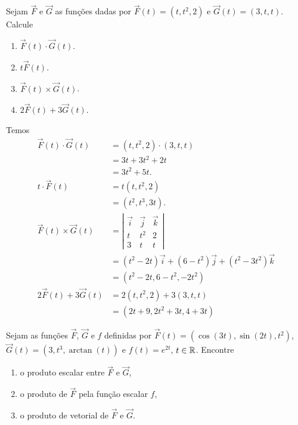 \begin{example}
    Sejam \(\overrightarrow{F} \) e \(\overrightarrow{G}\) as funções dadas por \(\overrightarrow{F}(t) = (t, t^2, 2)\) e \(\overrightarrow{G}(t) = (3,t,t)\). Calcule
        \begin{enumerate}
            \item \(\overrightarrow{F}(t)\cdot\overrightarrow{G}(t)\).
            \item \(t\overrightarrow{F}(t)\).
            \item \(\overrightarrow{F}(t)\times\overrightarrow{G}(t)\).
            \item \(2\overrightarrow{F}(t) + 3\overrightarrow{G}(t)\).
        \end{enumerate}

    Temos
        \begin{align*}
            \overrightarrow{F}(t)\cdot\overrightarrow{G}(t)
                & = (t,t^2,2)\cdot(3,t,t) \\
                & = 3t + 3t^2 + 2t\\
                & = 3t^2 + 5t.\\
            t\cdot\overrightarrow{F}(t)
                & = t(t,t^2,2)\\
                & = (t^2, t^3,3t).\\
            \overrightarrow{F}(t)\times\overrightarrow{G}(t)
                & = \left|\begin{matrix}
                    \overrightarrow{i} & \overrightarrow{j} & \overrightarrow{k}\\
                    t & t^2 & 2 \\
                    3 & t & t
                \end{matrix}\right| \\
                & = (t^2-2t)\overrightarrow{i} + (6-t^2)\overrightarrow{j} + (t^2-3t^2)\overrightarrow{k} \\
                & = (t^2 - 2t, 6-t^2, -2t^2)\\
            2\overrightarrow{F}(t) + 3\overrightarrow{G}(t)
                & = 2(t,t^2,2) + 3(3,t,t) \\
                & = (2t+9,2t^2+3t,4+3t)
        \end{align*}
\end{example}

\begin{exercise}
    Sejam as funções \(\overrightarrow{F}\), \(\overrightarrow{G}\) e \(f\) definidas por \(\overrightarrow{F}(t) = (\cos(3t), \sin(2t), t^2)\), \(\overrightarrow{G}(t) = (3,t^3,\arctan(t))\) e \(f(t) = e^{2t}\), \(t\in\mathbb{R}\). Encontre
        \begin{enumerate}
            \item o produto escalar entre \(\overrightarrow{F}\) e \(\overrightarrow{G}\),
            \item o produto de \(\overrightarrow{F}\) pela função escalar \(f\),
            \item o produto de vetorial de \(\overrightarrow{F}\) e \(\overrightarrow{G}\).
        \end{enumerate} 
\end{exercise}

